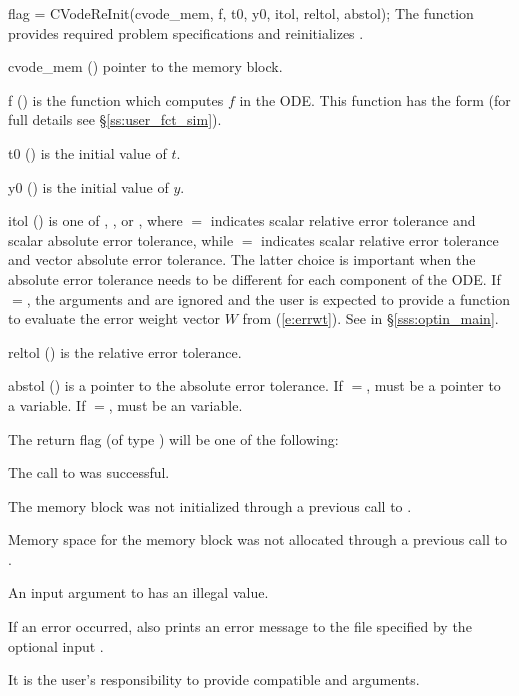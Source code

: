 {
  flag = CVodeReInit(cvode\_mem, f, t0, y0, itol, reltol, abstol);
}
{
  The function  provides required problem specifications 
  and reinitializes {\cvode}.
}
{
  \begin{args}
  \item[cvode\_mem] ()
    pointer to the {\cvode} memory block.
  \item[f] ()
    is the {\C} function which computes $f$ in the ODE. This function has the form 
     (for full details see \S\ref{ss:user_fct_sim}).
  \item[t0] ()
    is the initial value of $t$.
  \item[y0] ()
    is the initial value of $y$. 
  \item[itol] () 
    is one of , , or , where $=$ indicates
    scalar relative error tolerance and scalar absolute error tolerance, while
    $=$ indicates scalar relative error tolerance and vector
    absolute error tolerance.  The latter choice is important when the absolute
    error tolerance needs to be different for each component of the ODE. 
    If $=$, the arguments  and  are ignored
    and the user is expected to provide a function to evaluate the error weight vector
    $W$ from (\ref{e:errwt}). See  in \S\ref{sss:optin_main}.
  \item[reltol] ()
    is the relative error tolerance.
  \item[abstol] ()
    is a pointer to the absolute error tolerance. If $=$, 
    must be a pointer to a  variable. If $=$, 
    must be an  variable.
  \end{args}
}
{
  The return flag  (of type ) will be one of the following:
  \begin{args}[CV\_NO\_MALLOC]
  \item[\Id{CV\_SUCCESS}]
    The call to  was successful.
  \item[\Id{CV\_MEM\_NULL}] 
    The {\cvode} memory block was not initialized through a 
    previous call to .
  \item[\Id{CV\_NO\_MALLOC}] 
    Memory space for the {\cvode} memory block was not allocated through a 
    previous call to .
  \item[\Id{CV\_ILL\_INPUT}] 
    An input argument to  has an illegal value.
  \end{args}
}
{
  If an error occurred,  also prints an error message to the
  file specified by the optional input .

  {\warn} It is the user's responsibility to provide compatible  and
   arguments.
}


